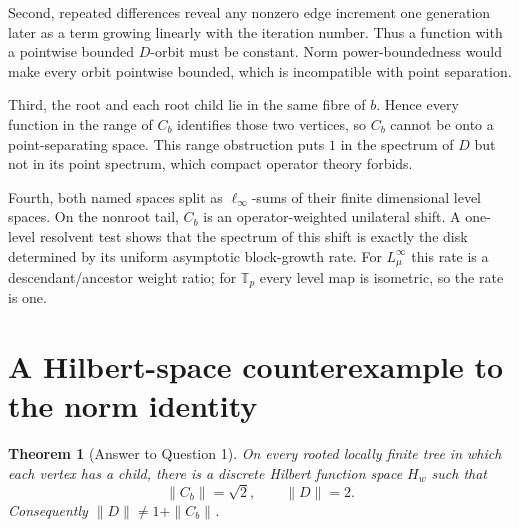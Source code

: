 \documentclass[11pt]{article}
\newtheorem{theorem}{Theorem}
\newcommand{\Cb}{C_b}
\begin{document}
Second, repeated differences reveal any nonzero edge increment one generation
later as a term growing linearly with the iteration number. Thus a function
with a pointwise bounded $D$-orbit must be constant. Norm power-boundedness
would make every orbit pointwise bounded, which is incompatible with point
separation.

Third, the root and each root child lie in the same fibre of $b$. Hence every
function in the range of $\Cb$ identifies those two vertices, so $\Cb$ cannot
be onto a point-separating space. This range obstruction puts $1$ in the
spectrum of $D$ but not in its point spectrum, which compact operator theory
forbids.

Fourth, both named spaces split as $\ell_\infty$-sums of their finite
dimensional level spaces. On the nonroot tail, $\Cb$ is an operator-weighted
unilateral shift. A one-level resolvent test shows that the spectrum of this
shift is exactly the disk determined by its uniform asymptotic block-growth
rate. For $L_\mu^\infty$ this rate is a descendant/ancestor weight ratio; for
$\mathbb T_p$ every level map is isometric, so the rate is one.

\section{A Hilbert-space counterexample to the norm identity}

\begin{theorem}[Answer to Question 1]\label{thm:norm}
On every rooted locally finite tree in which each vertex has a child, there is
a discrete Hilbert function space $H_w$ such that
\[
  \|\Cb\|=\sqrt2,\qquad \|D\|=2.
\]
Consequently $\|D\|\ne 1+\|\Cb\|$.
\end{theorem}
\end{document}
